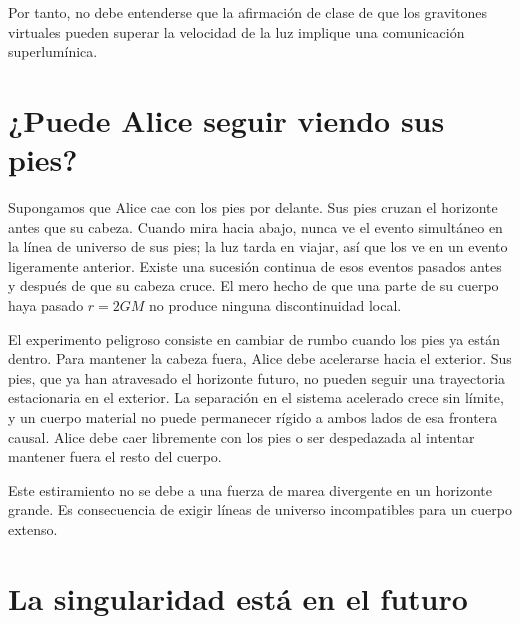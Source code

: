 Por tanto, no debe entenderse que la afirmación de clase de que los gravitones virtuales pueden superar la velocidad de la luz implique una comunicación superlumínica.

\section{¿Puede Alice seguir viendo sus pies?}

Supongamos que Alice cae con los pies por delante. Sus pies cruzan el horizonte antes que su cabeza. Cuando mira hacia abajo, nunca ve el evento simultáneo en la línea de universo de sus pies; la luz tarda en viajar, así que los ve en un evento ligeramente anterior. Existe una sucesión continua de esos eventos pasados antes y después de que su cabeza cruce. El mero hecho de que una parte de su cuerpo haya pasado \(r=2GM\) no produce ninguna discontinuidad local.

El experimento peligroso consiste en cambiar de rumbo cuando los pies ya están dentro. Para mantener la cabeza fuera, Alice debe acelerarse hacia el exterior. Sus pies, que ya han atravesado el horizonte futuro, no pueden seguir una trayectoria estacionaria en el exterior. La separación en el sistema acelerado crece sin límite, y un cuerpo material no puede permanecer rígido a ambos lados de esa frontera causal. Alice debe caer libremente con los pies o ser despedazada al intentar mantener fuera el resto del cuerpo.

Este estiramiento no se debe a una fuerza de marea divergente en un horizonte grande. Es consecuencia de exigir líneas de universo incompatibles para un cuerpo extenso.

\section{La singularidad está en el futuro}

